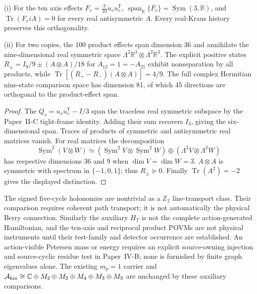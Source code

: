 \documentclass[12pt,a4paper]{article}
\begin{document}
\begin{proposition}
\label{p4c:prop:v320-quantum-readout-no-go}
(i) For the ten axis effects $F_v=\frac3{10}u_vu_v^{\mathsf T}$,
$\operatorname{span}_{\mathbb R}\{F_v\}
=\operatorname{Sym}(3,\mathbb R)$, and
$\operatorname{Tr}(F_v iA)=0$ for every real antisymmetric $A$.
Every real-Kraus history preserves this orthogonality.

(ii) For two copies, the 100 product effects span dimension 36 and
annihilate the nine-dimensional real symmetric space
$\Lambda^2\mathbb R^3\otimes\Lambda^2\mathbb R^3$.
The explicit positive states
$R_\pm=I_9/9\pm(A\otimes A)/18$ for
$A_{12}=1=-A_{21}$ exhibit nonseparation by all products, while
$\operatorname{Tr}[(R_+-R_-)(A\otimes A)]=4/9$.
The full complex Hermitian nine-state comparison space has dimension
81, of which 45 directions are orthogonal to the product-effect span.
\end{proposition}
\begin{proof}
The $Q_v=u_vu_v^{\mathsf T}-I/3$ span the traceless real symmetric
subspace by the Paper~II-C tight-frame identity. Adding their sum
recovers $I_3$, giving the six-dimensional span. Traces of products
of symmetric and antisymmetric real matrices vanish.
For real matrices the decomposition
\[
 \operatorname{Sym}^2(V\otimes W)
 \simeq(\operatorname{Sym}^2V\otimes\operatorname{Sym}^2W)
 \oplus(\Lambda^2V\otimes\Lambda^2W)
\]
has respective dimensions 36 and 9 when $\dim V=\dim W=3$.
$A\otimes A$ is symmetric with spectrum in $\{-1,0,1\}$;
thus $R_\pm\succeq0$. Finally
$\operatorname{Tr}(A^2)=-2$ gives the displayed distinction.
\end{proof}

\begin{remark}
\label{p4c:rem:v320-quantum-audit}
The signed five-cycle holonomies are nontrivial as a $\mathbb Z_2$
line-transport class. Their comparison requires coherent path
transport; it is not automatically the physical Berry connection.
Similarly the auxiliary $H_T$ is not the complete action-generated
Hamiltonian, and the ten-axis and reciprocal product POVMs are not
physical instruments until their test-family and detector occurrence
are established. An action-visible Petersen mass or energy requires
an explicit source-owning injection and source-cyclic residue test
in Paper~IV-B; none is furnished by finite graph eigenvalues alone.
The existing $m_p=1$ carrier and
$\mathcal A_{\rm kin}\cong\mathbb C\oplus M_2\oplus M_2\oplus M_4
\oplus M_3\oplus M_3$ are unchanged by these auxiliary comparisons.
\end{remark}
\end{document}
